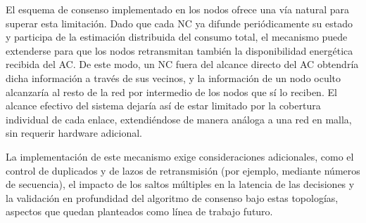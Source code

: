 El esquema de consenso implementado en los nodos ofrece una vía natural para superar esta limitación. Dado que cada NC ya difunde periódicamente su estado y participa de la estimación distribuida del consumo total, el mecanismo puede extenderse para que los nodos retransmitan también la disponibilidad energética recibida del AC. De este modo, un NC fuera del alcance directo del AC obtendría dicha información a través de sus vecinos, y la información de un nodo oculto alcanzaría al resto de la red por intermedio de los nodos que sí lo reciben. El alcance efectivo del sistema dejaría así de estar limitado por la cobertura individual de cada enlace, extendiéndose de manera análoga a una red en malla, sin requerir hardware adicional.

La implementación de este mecanismo exige consideraciones adicionales, como el control de duplicados y de lazos de retransmisión (por ejemplo, mediante números de secuencia), el impacto de los saltos múltiples en la latencia de las decisiones y la validación en profundidad del algoritmo de consenso bajo estas topologías, aspectos que quedan planteados como línea de trabajo futuro.